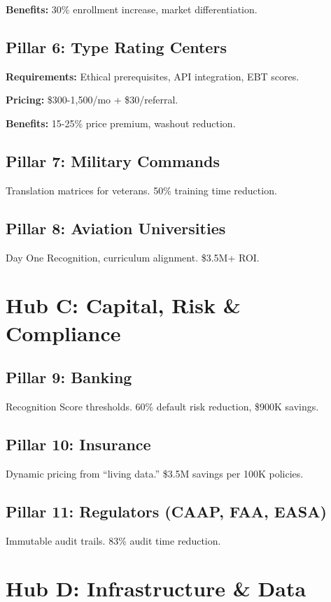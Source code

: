 \documentclass[11pt, a4paper]{article}
\begin{document}
\textbf{Benefits:} 30\% enrollment increase, market differentiation.

\subsection{Pillar 6: Type Rating Centers}
\textbf{Requirements:} Ethical prerequisites, API integration, EBT scores.

\textbf{Pricing:} \$300-1,500/mo + \$30/referral.

\textbf{Benefits:} 15-25\% price premium, washout reduction.

\subsection{Pillar 7: Military Commands}
Translation matrices for veterans. 50\% training time reduction.

\subsection{Pillar 8: Aviation Universities}
Day One Recognition, curriculum alignment. \$3.5M+ ROI.

\section{Hub C: Capital, Risk \& Compliance}

\subsection{Pillar 9: Banking}
Recognition Score thresholds. 60\% default risk reduction, \$900K savings.

\subsection{Pillar 10: Insurance}
Dynamic pricing from ``living data.'' \$3.5M savings per 100K policies.

\subsection{Pillar 11: Regulators (CAAP, FAA, EASA)}
Immutable audit trails. 83\% audit time reduction.

\section{Hub D: Infrastructure \& Data}
\end{document}
